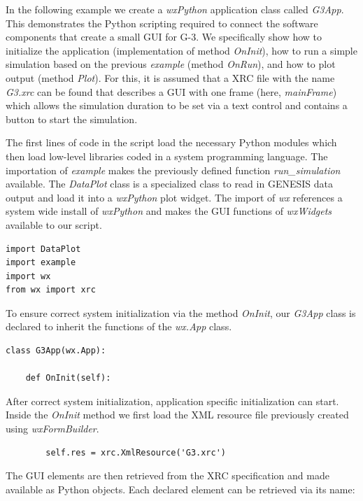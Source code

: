\documentclass[12pt]{article}
\begin{document}
In the following example we create a {\it wxPython} application class
called {\it G3App}. This demonstrates the Python scripting required to
connect the software components that create a small GUI for G-3.  We
specifically show how to initialize the application (implementation of
method {\it OnInit}), how to run a simple simulation based on the
previous {\it example} (method {\it OnRun}), and how to plot output
(method {\it Plot}).  For this, it is assumed that a XRC file with the
name {\it G3.xrc} can be found that describes a GUI with one frame
(here, {\it mainFrame}) which allows the simulation duration to be set
via a text control and contains a button to start the simulation.

The first lines of code in the script load the necessary Python
modules which then load low-level libraries coded in a system
programming language.  The importation of {\it example} makes the
previously defined function {\it run\_simulation} available.  The {\it
  DataPlot} class is a specialized class to read in GENESIS data
output and load it into a {\it wxPython} plot widget.  The import of
{\it wx} references a system wide install of {\it wxPython} and makes
the GUI functions of {\it wxWidgets} available to our script.

{\footnotesize
  \linenumbers*
\begin{verbatim}
import DataPlot
import example
import wx
from wx import xrc
\end{verbatim}
}

To ensure correct system initialization via the method {\it OnInit},
our {\it G3App} class is declared to inherit the functions of the {\it
  wx.App} class.

{\footnotesize
\linenumbers
 \begin{verbatim}
class G3App(wx.App):

    def OnInit(self): \end{verbatim}
}

After correct system initialization, application specific
initialization can start.  Inside the {\it OnInit} method we first
load the XML resource file previously created using {\it
  wxFormBuilder}.

{\footnotesize
   \linenumbers
 \begin{verbatim}
        self.res = xrc.XmlResource('G3.xrc') \end{verbatim}
}

The GUI elements are then retrieved from the XRC specification and
made available as Python objects.  Each declared element can be
retrieved via its name:
\end{document}

